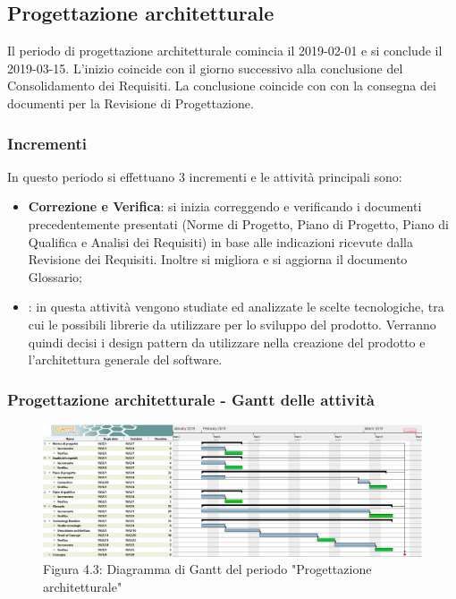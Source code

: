 \subsection{Progettazione architetturale}
Il periodo di progettazione architetturale comincia il 2019-02-01 e si conclude il 2019-03-15. L'inizio coincide con il giorno successivo alla conclusione del Consolidamento dei Requisiti. La conclusione coincide con con la consegna dei documenti per la Revisione di Progettazione. 
\subsubsection{Incrementi}
In questo periodo si effettuano 3 incrementi e le attività principali sono:
\begin{itemize}
	\item \textbf{Correzione e Verifica}: si inizia correggendo e verificando i documenti precedentemente presentati (Norme di Progetto, Piano di Progetto, Piano di Qualifica e Analisi dei Requisiti) in base alle indicazioni ricevute dalla Revisione dei Requisiti. Inoltre si migliora e si aggiorna il documento Glossario;
	\item \textbf{}: in questa attività vengono studiate ed analizzate le scelte tecnologiche, tra cui le possibili librerie da utilizzare per lo sviluppo del prodotto. Verranno quindi decisi i design pattern da utilizzare nella creazione del prodotto e l'architettura generale del software.
\end{itemize}

\subsubsection{Progettazione architetturale - Gantt delle attività}

\begin{figure} [H]
	\centering
	\includegraphics[scale=0.3]{Res/Gantt/Progettazione}
	\caption{Figura 4.3: Diagramma di Gantt del periodo "Progettazione architetturale"}\label{}
\end{figure}

\pagebreak
